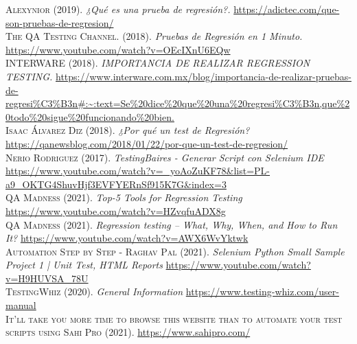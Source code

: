 \documentclass[conference]{IEEEtran}
\begin{document}
\normalsize

\begin{thebibliography}{}
 \textsc{Alexynior} (2019). \textit{¿Qué es una prueba de regresión?.} \url{https://adictec.com/que-son-pruebas-de-regresion/}\\

 \textsc{The QA Testing Channel.} (2018). \textit{Pruebas de Regresión en 1 Minuto.} \url{https://www.youtube.com/watch?v=OEcIXnU6EQw} \\


 \textsc{INTERWARE} (2018). \textit{IMPORTANCIA DE REALIZAR REGRESSION TESTING.} \url{https://www.interware.com.mx/blog/importancia-de-realizar-pruebas-de-regresi\%C3\%B3n\#:\~:text=Se\%20dice\%20que\%20una\%20regresi\%C3\%B3n,que\%20todo\%20sigue\%20funcionando\%20bien.} \\

 \textsc{Isaac Álvarez Diz} (2018). \textit{¿Por qué un test de Regresión?} \url{https://qanewsblog.com/2018/01/22/por-que-un-test-de-regresion/} \\


 \textsc{Nerio Rodriguez} (2017). \textit{TestingBaires - Generar Script con Selenium IDE} \url{https://www.youtube.com/watch?v=_yoAoZuKF78&list=PL-a9_OKTG4ShuvHjf3EVFYERnSf915K7G&index=3} \\

 \textsc{QA Madness} (2021). \textit{Top-5 Tools for Regression Testing} \url{https://www.youtube.com/watch?v=HZvqfuADX8g} \\

 \textsc{QA Madness} (2021). \textit{Regression testing – What, Why, When, and How to Run It?} \url{https://www.youtube.com/watch?v=AWX6WvYktwk} \\

 \textsc{Automation Step by Step - Raghav Pal} (2021). \textit{Selenium Python Small Sample Project 1 | Unit Test, HTML Reports} \url{https://www.youtube.com/watch?v=H9HUVSA_78U} \\

 \textsc{TestingWhiz} (2020). \textit{General Information} \url{https://www.testing-whiz.com/user-manual} \\

 \textsc{It'll take you more time to browse this website than to automate your test scripts using Sahi Pro} (2021). \url{https://www.sahipro.com/} \\


\end{thebibliography}
\end{document}
